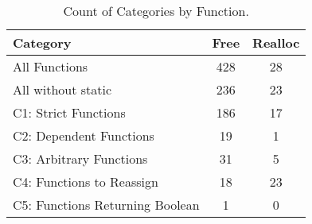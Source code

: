 \begin{table}[H]
   \begin{center}
   \begin{tabularx}{0.6\linewidth}{l|c|c}

      Category & Free & Realloc \\
      \hline

      All Functions& 428 & 28 \\

      All without static& 236 & 23 \\

      C1: Strict Functions& 186 & 17 \\

      C2: Dependent Functions& 19 & 1 \\

      C3: Arbitrary Functions& 31 & 5 \\

      C4: Functions to Reassign& 18 & 23 \\

      C5: Functions Returning Boolean& 1 & 0 \\

   \end{tabularx}
\end{center}
   \caption{Count of Categories by Function.}
   \label{tab:categories:overview}
\end{table}

